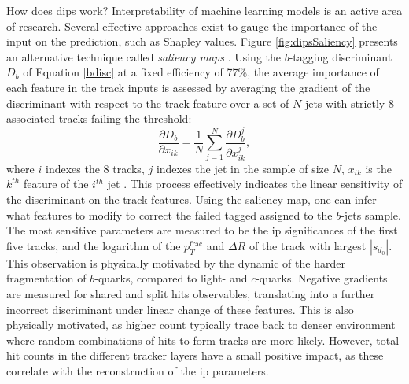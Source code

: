 How does \gls{dips} work? Interpretability of machine learning models is an active area of research. Several effective approaches exist to gauge the importance of the input on the prediction, such as Shapley values. Figure \ref{fig:dipsSaliency} presents an alternative technique called \textit{saliency maps} \cite{Simonyan2013DeepIC}. Using the $b$-tagging discriminant $D_b$ of Equation \ref{bdisc} at a fixed efficiency of 77\%, the average importance of each feature in the track inputs is assessed by averaging the gradient of the discriminant with respect to the track feature over a set of $N$ jets with strictly 8 associated tracks failing the threshold:
\begin{equation}
  \frac{\partial D_b}{\partial x_{ik}} = \frac{1}{N} \sum_{j=1}^N \frac{\partial D_b^{j}}{\partial x_{ik}^{j}},
\end{equation} 
where $i$ indexes the 8 tracks, $j$ indexes the jet in the sample of size $N$, $x_{ik}$ is the $k^{th}$ feature of the $i^{th}$ jet \cite{ATL-PHYS-PUB-2020-014}. This process effectively indicates the linear sensitivity of the discriminant on the track features. Using the saliency map, one can infer what features to modify to correct the failed tagged assigned to the $b$-jets sample. The most sensitive parameters are measured to be the \gls{ip} significances of the first five tracks, and the logarithm of the $p_T^{\textrm{frac}}$ and $\Delta R$ of the track with largest $|s_{d_0}|$. This observation is physically motivated by the dynamic of the harder fragmentation of $b$-quarks, compared to light- and $c$-quarks. Negative gradients are measured for shared and split hits observables, translating into a further incorrect discriminant under linear change of these features. This is also physically motivated, as higher count typically trace back to denser environment where random combinations of hits to form tracks are more likely. However, total hit counts in the different tracker layers have a small positive impact, as these correlate with the reconstruction of the \gls{ip} parameters.

